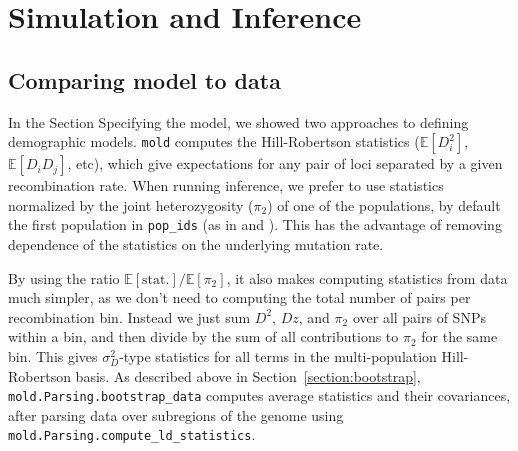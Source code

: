 \documentclass[10pt]{article}
\makeatletter
\newcommand{\mold}{\texttt{mold}\xspace}
\newcommand{\py}[1]{\lstinline[breaklines=true,language=Python, showstringspaces=False]@#1@}
\newcommand{\E}{\mathbb{E}}
\makeatother
\begin{document}
%    
%    

\clearpage

\section{Simulation and Inference}


\subsection{Comparing model to data}

In the Section Specifying the model, we showed two approaches to defining demographic models.
\mold computes the Hill-Robertson statistics ($\E[D_i^2]$, $\E[D_i D_j]$, etc), which give expectations for any pair of loci separated by a given recombination rate.
When running inference, we prefer to use statistics normalized by the joint heterozygosity ($\pi_2$) of one of the populations, by default the first population in \py{pop_ids} (as in \citet{Rogers2014} and \citet{Ragsdale2018}).
This has the advantage of removing dependence of the statistics on the underlying mutation rate.

By using the ratio $\E[\text{stat.}]/\E[\pi_2]$, it also makes computing statistics from data much simpler, as we don't need to computing the total number of pairs per recombination bin.
Instead we just sum $D^2$, $Dz$, and $\pi_2$ over all pairs of SNPs within a bin, and then divide by the sum of all contributions to $\pi_2$ for the same bin.
This gives $\sigma_D^2$-type statistics for all terms in the multi-population Hill-Robertson basis.
As described above in Section~\ref{section:bootstrap}, \py{mold.Parsing.bootstrap_data} computes average statistics and their covariances, after parsing data over subregions of the genome using \py{mold.Parsing.compute_ld_statistics}.
\end{document}
